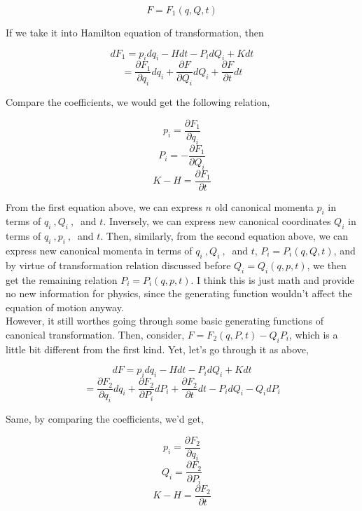 \documentclass[12pt]{article}
\numberwithin{equation}{section}
\begin{document}
\begin{center}
    \[ F = F_1(q, Q, t) \]
\end{center}

If we take it into Hamilton equation of transformation, then

\begin{center}
    \[ dF_1 = p_idq_i - Hdt - P_idQ_i + Kdt \]
    \[ = \frac{\partial F_1}{\partial q_i} dq_i + \frac{\partial F}{\partial Q_i}dQ_i + \frac{\partial F}{\partial t}dt \]
\end{center}

Compare the coefficients, we would get the following relation,

\begin{center}
    \[ p_i = \frac{\partial F_1}{\partial q_i} \]
    \[ P_i = -\frac{\partial F_1}{\partial Q_i } \]
    \[ K - H = \frac{\partial F_1}{\partial t} \]
\end{center}

From the first equation above, we can express $n$ old canonical momenta $p_i$ in terms of $q_i\ , Q_i\ ,\ $ and $t$. Inversely, we can express new canonical coordinates $Q_i$ in terms of $q_i\ ,p_i\ ,\ $ and $t$. Then, similarly, from the second equation above, we can express new canonical momenta in terms of $q_i\ ,Q_i\ ,\ $ and $t$, $P_i = P_i(q, Q, t)$, and by virtue of transformation relation discussed before $Q_i = Q_i(q, p, t)$, we then get the remaining relation $P_i = P_i(q, p, t)$. I think this is just math and provide no new information for physics, since the generating function wouldn't affect the equation of motion anyway.
\\
\indent However, it still worthes going through some basic generating functions of canonical transformation. Then, consider, $F = F_2(q, P ,t) - Q_iP_i$, which is a little bit different from the first kind. Yet, let's go through it as above,

\begin{center}
    \[ dF = p_idq_i - Hdt - P_idQ_i + Kdt \]
    \[ = \frac{\partial F_2}{\partial q_i}dq_i + \frac{\partial F_2}{\partial P_i}dP_i + \frac{\partial F_2}{\partial t}dt - P_idQ_i - Q_idP_i \]
\end{center}

Same, by comparing the coefficients, we'd get,

\begin{center}
    \[ p_i = \frac{\partial F_2}{\partial q_i} \]
    \[ Q_i = \frac{\partial F_2}{\partial P_i} \]
    \[ K -H = \frac{\partial F_2}{\partial t} \]
\end{center}
\end{document}

